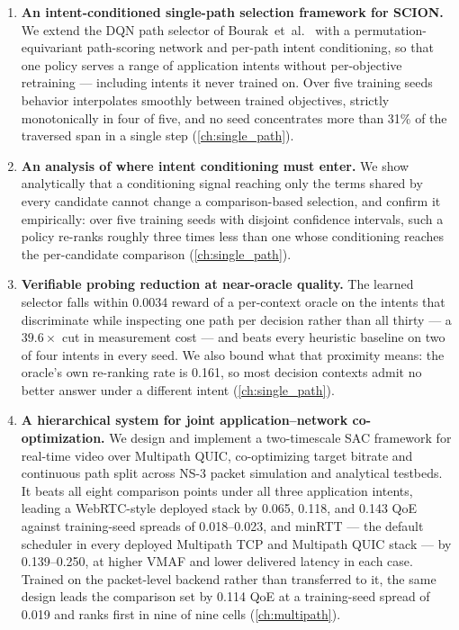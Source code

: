 \begin{enumerate}
  \item \textbf{An intent-conditioned single-path selection framework for SCION.} We extend the DQN
  path selector of Bourak~et~al.~\cite{Bourak2025} with a permutation-equivariant path-scoring network
  and per-path intent conditioning, so that one policy serves a range of application intents without
  per-objective retraining --- including intents it never trained on. Over five training seeds behavior
  interpolates smoothly between trained objectives, strictly monotonically in four of five, and no seed
  concentrates more than 31\% of the traversed span in a single step (\cref{ch:single_path}).

  \item \textbf{An analysis of where intent conditioning must enter.} We show analytically that a
  conditioning signal reaching only the terms shared by every candidate cannot change a comparison-based
  selection, and confirm it empirically: over five training seeds with disjoint confidence intervals,
  such a policy re-ranks roughly three times less than one whose conditioning reaches the per-candidate
  comparison (\cref{ch:single_path}).

  \item \textbf{Verifiable probing reduction at near-oracle quality.} The learned selector falls within
  0.0034 reward of a per-context oracle on the intents that discriminate while inspecting one path per
  decision rather than all thirty --- a $39.6\times$ cut in measurement cost --- and beats every
  heuristic baseline on two of four intents in every seed. We also bound what that proximity means: the
  oracle's own re-ranking rate is 0.161, so most decision contexts admit no better answer under a
  different intent (\cref{ch:single_path}).

  \item \textbf{A hierarchical system for joint application--network co-optimization.} We design and
  implement a two-timescale SAC framework for real-time video over Multipath QUIC, co-optimizing target
  bitrate and continuous path split across NS-3 packet simulation and analytical testbeds. It beats all
  eight comparison points under all three application intents, leading a WebRTC-style deployed stack by
  0.065, 0.118, and 0.143 QoE against training-seed spreads of 0.018--0.023, and minRTT --- the default
  scheduler in every deployed Multipath TCP and Multipath QUIC stack --- by 0.139--0.250, at higher VMAF
  and lower delivered latency in each case. Trained on the packet-level backend rather than transferred
  to it, the same design leads the comparison set by 0.114 QoE at a training-seed spread of 0.019 and
  ranks first in nine of nine cells (\cref{ch:multipath}).


\end{enumerate}
